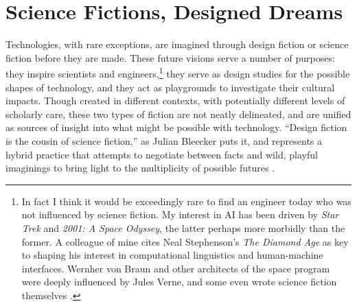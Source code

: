 \chapter{Science Fictions, Designed Dreams}
\label{chap:2}













Technologies, with rare exceptions, are imagined through design
fiction or science fiction before they are made. These future
visions serve a number of purposes:  they inspire scientists and
engineers,\footnote{In fact I think it would be exceedingly rare to
  find an engineer today who was not influenced by science fiction. My
  interest in AI has been driven by \emph{Star Trek} and \emph{2001: A
  Space Odyssey}, the latter perhaps more morbidly than the former. A
  colleague of mine cites Neal Stephenson's
  \emph{The Diamond Age} as key to shaping his interest in
  computational linguistics and human-machine interfaces. Wernher von
  Braun and other architects of the space program were deeply
  influenced by Jules Verne, and some even wrote science fiction
  themselves \cite[p. 2]{marketingMoon}.} they serve as design
studies for the possible shapes of technology, and they act as
playgrounds to investigate their cultural impacts.
Though created in different contexts, with potentially 
different levels of scholarly care, these two types of fiction are not
neatly delineated, and are unified as sources of insight into what
might be possible with technology. ``Design fiction is the cousin of
science fiction,'' as Julian Bleecker puts it, and represents a hybrid
practice that attempts to negotiate between facts and wild, playful
imaginings to bring light to the multiplicity of possible
futures \cite[p. 8]{bleecker}. 

